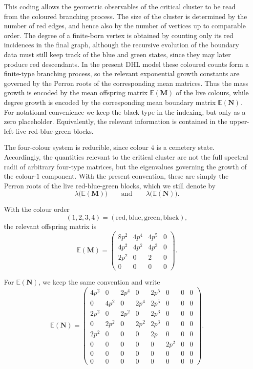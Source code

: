 \documentclass{article}
\theoremstyle{plain}
\theoremstyle{definition}
\begin{document}
This coding allows the geometric observables of the critical cluster to be read from the coloured branching process.
The size of the cluster is determined by the number of red edges, and hence also by the number of vertices up to comparable order.
The degree of a finite-born vertex is obtained by counting only its red incidences in the final graph, although the recursive evolution of the boundary data must still keep track of the blue and green states, since they may later produce red descendants.
In the present DHL model these coloured counts form a finite-type branching process, so the relevant exponential growth constants are governed by the Perron roots of the corresponding mean matrices.
Thus the mass growth is encoded by the mean offspring matrix $\mathbb E(\mathbf M)$ of the live colours, while degree growth is encoded by the corresponding mean boundary matrix $\mathbb E(\mathbf N)$.
For notational convenience we keep the black type in the indexing, but only as a zero placeholder.
Equivalently, the relevant information is contained in the upper-left live red-blue-green blocks.

The four-colour system is reducible, since colour $4$ is a cemetery state.
Accordingly, the quantities relevant to the critical cluster are not the full spectral radii of arbitrary four-type matrices, but the eigenvalues governing the growth of the colour-$1$ component.
With the present convention, these are simply the Perron roots of the live red-blue-green blocks, which we still denote by
\[
\lambda\bigl(\mathbb E(\mathbf M)\bigr)
\qquad
\text{and}
\qquad
\lambda\bigl(\mathbb E(\mathbf N)\bigr).
\]

With the colour order
\[
(1,2,3,4)=(\mathrm{red},\mathrm{blue},\mathrm{green},\mathrm{black}),
\]
the relevant offspring matrix is
\[
\mathbb E(\mathbf M)
=
\begin{pmatrix}
8p^2 & 4p^4 & 4p^5 & 0\\
4p^2 & 4p^2 & 4p^3 & 0\\
2p^2 & 0 & 2 & 0\\
0 & 0 & 0 & 0
\end{pmatrix}.
\]

For $\mathbb E(\mathbf N)$, we keep the same convention and write
\[
\mathbb E(\mathbf N)
=
\begin{pmatrix}
4p^2&0&2p^4&0&2p^5&0&0&0\\
0&4p^2&0&2p^4&2p^5&0&0&0\\
2p^2&0&2p^2&0&2p^3&0&0&0\\
0&2p^2&0&2p^2&2p^3&0&0&0\\
2p^2&0&0&0&2p&0&0&0\\
0&0&0&0&0&2p^2&0&0\\
0&0&0&0&0&0&0&0\\
0&0&0&0&0&0&0&0
\end{pmatrix}.
\]
\end{document}
